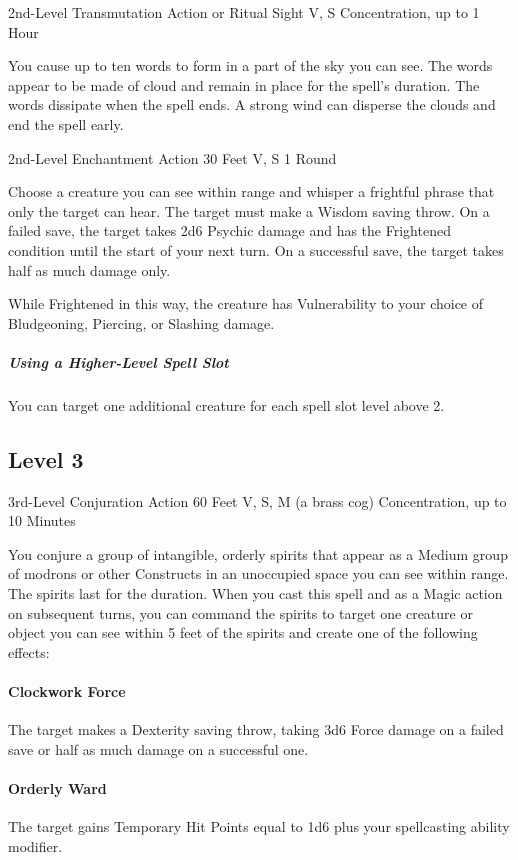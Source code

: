 \documentclass[letterpaper,openany,oneside,twocolumn]{book}
\begin{document}
	{2nd-Level Transmutation}
	{Action or Ritual}
	{Sight}
	{V, S}
	{Concentration, up to 1 Hour}

You cause up to ten words to form in a part of the sky you can see. The words appear to be made of cloud and remain in place for the spell's duration. The words dissipate when the spell ends. A strong wind can disperse the clouds and end the spell early.

	{2nd-Level Enchantment}
	{Action}
	{30 Feet}
	{V, S}
	{1 Round}

Choose a creature you can see within range and whisper a frightful phrase that only the target can hear. The target must make a Wisdom saving throw. On a failed save, the target takes 2d6 Psychic damage and has the Frightened condition until the start of your next turn. On a successful save, the target takes half as much damage only.

While Frightened in this way, the creature has Vulnerability to your choice of Bludgeoning, Piercing, or Slashing damage.

\subparagraph*{Using a Higher-Level Spell Slot} You can target one additional creature for each spell slot level above 2.

\subsection*{Level 3}

	{3rd-Level Conjuration}
	{Action}
	{60 Feet}
	{V, S, M (a brass cog)}
	{Concentration, up to 10 Minutes}

You conjure a group of intangible, orderly spirits that appear as a Medium group of modrons or other Constructs in an unoccupied space you can see within range. The spirits last for the duration. When you cast this spell and as a Magic action on subsequent turns, you can command the spirits to target one creature or object you can see within 5 feet of the spirits and create one of the following effects:

\paragraph*{Clockwork Force} The target makes a Dexterity saving throw, taking 3d6 Force damage on a failed save or half as much damage on a successful one.

\paragraph*{Orderly Ward} The target gains Temporary Hit Points equal to 1d6 plus your spellcasting ability modifier.
\end{document}
